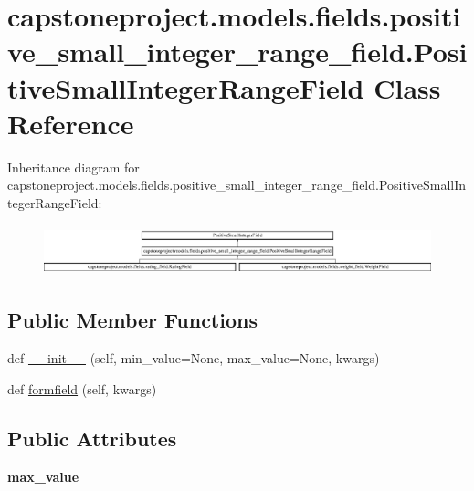 \hypertarget{classcapstoneproject_1_1models_1_1fields_1_1positive__small__integer__range__field_1_1_positive_small_integer_range_field}{}\section{capstoneproject.\+models.\+fields.\+positive\+\_\+small\+\_\+integer\+\_\+range\+\_\+field.\+Positive\+Small\+Integer\+Range\+Field Class Reference}
\label{classcapstoneproject_1_1models_1_1fields_1_1positive__small__integer__range__field_1_1_positive_small_integer_range_field}
Inheritance diagram for capstoneproject.\+models.\+fields.\+positive\+\_\+small\+\_\+integer\+\_\+range\+\_\+field.\+Positive\+Small\+Integer\+Range\+Field\+:\begin{figure}[H]
\begin{center}
\leavevmode
\includegraphics[height=1.481482cm]{classcapstoneproject_1_1models_1_1fields_1_1positive__small__integer__range__field_1_1_positive_small_integer_range_field}
\end{center}
\end{figure}
\subsection*{Public Member Functions}
\begin{DoxyCompactItemize}
\item 
def \mbox{\hyperlink{classcapstoneproject_1_1models_1_1fields_1_1positive__small__integer__range__field_1_1_positive_small_integer_range_field_a10fbbb5e5f49ba11d7f2333711f9ce34}{\+\_\+\+\_\+init\+\_\+\+\_\+}} (self, min\+\_\+value=None, max\+\_\+value=None, kwargs)
\item 
def \mbox{\hyperlink{classcapstoneproject_1_1models_1_1fields_1_1positive__small__integer__range__field_1_1_positive_small_integer_range_field_ae2db3d515bb797aecdb17a4524b8fc8b}{formfield}} (self, kwargs)
\end{DoxyCompactItemize}
\subsection*{Public Attributes}
\begin{DoxyCompactItemize}
\item 
\mbox{\label{classcapstoneproject_1_1models_1_1fields_1_1positive__small__integer__range__field_1_1_positive_small_integer_range_field_a021ad24c9771d3a946bc7505bde56789}} 
{\bfseries max\+\_\+value}
\end{DoxyCompactItemize}


